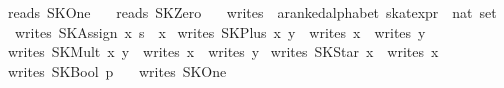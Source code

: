 \begin{isabellebody}
{}\ {}reads\ SKOne\ {}\ {}{}{}\isanewline
{}\ {}reads\ SKZero\ {}\ {}{}{}\isanewline
\isanewline
{}\isamarkupfalse%
\ writes\ {}{}\ {}{}a{}{}ranked{}alphabet\ skat{}expr\ {}\ nat\ set{}\ \isanewline
\ \ {}writes\ {}SKAssign\ x\ s{}\ {}\ {}x{}{}\isanewline
{}\ {}writes\ {}SKPlus\ x\ y{}\ {}\ writes\ x\ {}\ writes\ y{}\isanewline
{}\ {}writes\ {}SKMult\ x\ y{}\ {}\ writes\ x\ {}\ writes\ y{}\isanewline
{}\ {}writes\ {}SKStar\ x{}\ {}\ writes\ x{}\isanewline
{}\ {}writes\ {}SKBool\ p{}\ {}\ {}{}{}\isanewline
{}\ {}writes\ SKOne\ {}\ {}{}{}\isanewline

\end{isabellebody}
